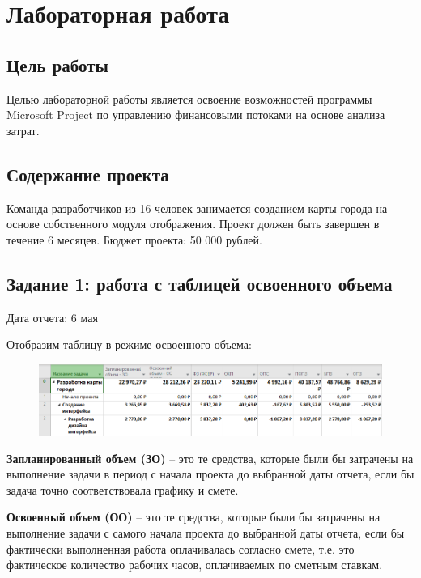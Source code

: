 \chapter{Лабораторная работа}

\section*{Цель работы}

Целью лабораторной работы является освоение возможностей программы
Microsoft Project по управлению финансовыми потоками на основе анализа
затрат.

\section*{Содержание проекта}

Команда разработчиков из 16 человек занимается созданием карты города на основе собственного модуля отображения. Проект должен быть завершен в течение 6 месяцев. Бюджет проекта: 50 000 рублей.

\section*{Задание 1: работа с таблицей освоенного объема}

Дата отчета: 6 мая

Отобразим таблицу в режиме освоенного объема:

\begin{figure}[H]
	\begin{center}
		\includegraphics[width=\textwidth]{imgs/task_1_0.png}
	\end{center}
\end{figure}

\textbf{Запланированный объем (ЗО)} -- это те средства, которые были бы затрачены на выполнение задачи в период с начала проекта до выбранной даты отчета, если бы задача точно соответствовала графику и смете.

\textbf{Освоенный объем (ОО)} -- это те средства, которые были бы затрачены на выполнение задачи с самого начала проекта до выбранной даты отчета, если бы фактически выполненная работа оплачивалась согласно смете, т.е. это фактическое количество рабочих часов, оплачиваемых по сметным ставкам.


